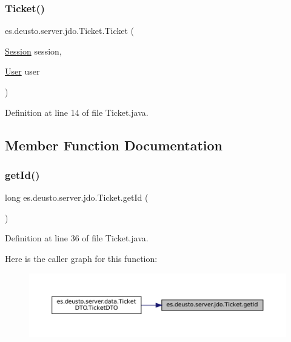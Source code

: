 \subsubsection{\texorpdfstring{Ticket()}{Ticket()}}
{\footnotesize\ttfamily es.\+deusto.\+server.\+jdo.\+Ticket.\+Ticket (\begin{DoxyParamCaption}\item[{\mbox{\hyperlink{classes_1_1deusto_1_1server_1_1jdo_1_1_session}{Session}}}]{session,  }\item[{\mbox{\hyperlink{classes_1_1deusto_1_1server_1_1jdo_1_1_user}{User}}}]{user }\end{DoxyParamCaption})}



Definition at line 14 of file Ticket.\+java.



\subsection{Member Function Documentation}
\mbox{\label{classes_1_1deusto_1_1server_1_1jdo_1_1_ticket_a9dadf081db69123f90cfe2cb9f7c0870}} 
\subsubsection{\texorpdfstring{getId()}{getId()}}
{\footnotesize\ttfamily long es.\+deusto.\+server.\+jdo.\+Ticket.\+get\+Id (\begin{DoxyParamCaption}{ }\end{DoxyParamCaption})}



Definition at line 36 of file Ticket.\+java.

Here is the caller graph for this function\+:
\nopagebreak
\begin{figure}[H]
\begin{center}
\leavevmode
\includegraphics[width=350pt]{classes_1_1deusto_1_1server_1_1jdo_1_1_ticket_a9dadf081db69123f90cfe2cb9f7c0870_icgraph}
\end{center}
\end{figure}
\mbox{\label{classes_1_1deusto_1_1server_1_1jdo_1_1_ticket_a60d6aebd66fee1d5d0ebde52540dcac9}} 
